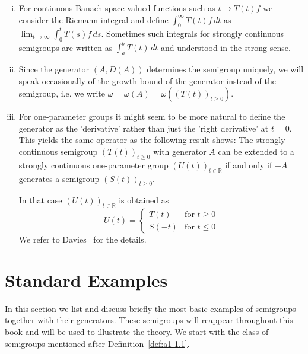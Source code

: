 \begin{remarks}\label{rem:a1-1.12}

\begin{enumerate}[(i)]

\item For continuous Banach space valued functions such as $t \mapsto T(t)f$ we consider the Riemann integral and define $\int_{0}^{\infty}T(t)f \, dt$ as $\lim_{t \to \infty}\int_{0}^{t}T(s)f \, ds$.
Sometimes such integrals for strongly continuous semigroups are written as $\int_{a}^{b}T(t) \, dt$ and understood in the strong sense.

\item Since the generator $(A,D(A))$ determines the semigroup uniquely, we will speak occasionally of the growth bound of the generator instead of the semigroup, i.e. we write $\omega = \omega(A) = \omega((T(t))_{t \geq 0})$.

\item For one-parameter groups it might seem to be more natural to define the generator as the 'derivative' rather than just the 'right derivative' at $t = 0$.
This yields the same operator as the following result shows:
The strongly continuous semigroup $(T(t))_{t \geq 0}$ with generator $A$ can be extended to a strongly continuous one-parameter group $(U(t))_{t \in \mathbb{R}}$ if and only if $-A$ generates a semigroup $(S(t))_{t \geq 0}$.

In that case $(U(t))_{t \in \mathbb{R}}$ is obtained as
\[
    U(t) = \begin{cases}
        T(t) & \text{for } t \geq 0 \\
        S(-t) & \text{for } t \leq 0
    \end{cases}
\]
We refer to Davies~\cite[Prop.1.14]{davies:1980} for the details.

\end{enumerate}
\end{remarks}

\newpage

\section{Standard Examples}\label{sec:a1-2}


In this section we list and discuss briefly the most basic examples of semigroups together with their generators.
These semigroups will reappear throughout this book and will be used to illustrate the theory.
We start with the class of semigroups mentioned after Definition~\ref{def:a1-1.1}.

